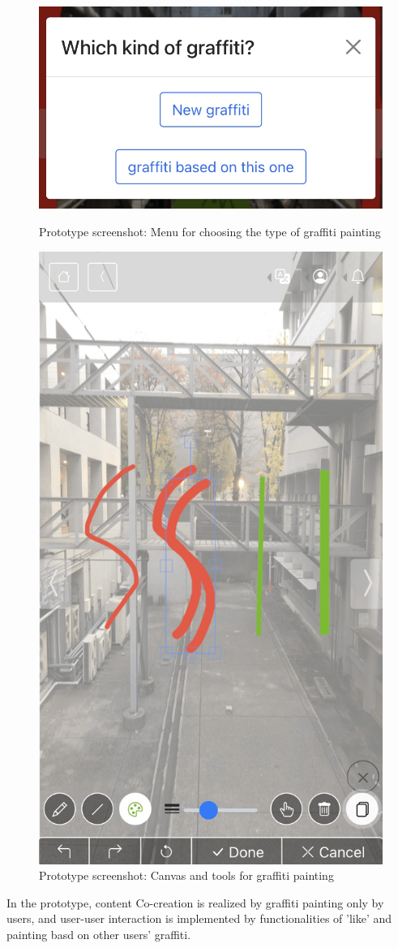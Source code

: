 \begin{figure}
  \begin{minipage}{0.48\textwidth}
    \centering
    \includegraphics[width=0.9\linewidth]{resources/4_methodology/prototype_choose_graffiti_type.png}
      \caption{Prototype screenshot: Menu for choosing the type of graffiti painting}
  \end{minipage}\hfill
  \begin{minipage}{0.48\textwidth}
    \centering
    \includegraphics[width=0.9\linewidth]{resources/4_methodology/prototype_canvas.png}
      \caption{Prototype screenshot: Canvas and tools for graffiti painting}
  \end{minipage}
\end{figure}

In the prototype, content Co-creation is realized by graffiti painting only by users,
and user-user interaction is implemented by functionalities of 'like' and painting basd on other users' graffiti.
